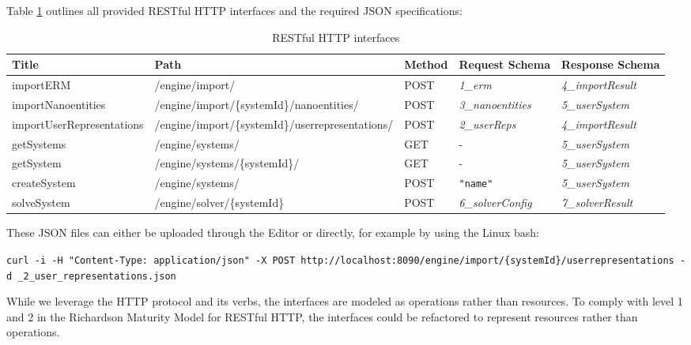 Table \ref{tab:restApis} outlines all provided RESTful HTTP interfaces and the required \gls{JSON} specifications:

\begin{table}[H]
	\centering
	\caption{RESTful HTTP interfaces}
	\label{tab:restApis}
	\begin{tabular}{|p{90pt}|p{140pt}|p{40pt}|p{80pt}|p{80pt}|}
		\hline	
		\textbf{Title} & \textbf{Path} & \textbf{Method} & \textbf{Request Schema} &\textbf{Response Schema} \\
		\hline
		importERM & /engine/import/ & POST & \textit{1\_erm} & \textit{4\_importResult} \\
		\hline
		importNanoentities & /engine/import/\{systemId\}/\newline nanoentities/ & POST & \textit{3\_nanoentities} & \textit{5\_userSystem} \\
		\hline 
		importUser\newline Representations & /engine/import/\{systemId\}/\newline userrepresentations/ & POST &  \textit{2\_userReps} &  \textit{4\_importResult} \\
		\hline 
		getSystems & /engine/systems/ & GET & - &  \textit{5\_userSystem} \\
		\hline 
		getSystem & /engine/systems/\{systemId\}/ & GET & - & \textit{5\_userSystem} \\
		\hline 
		createSystem & /engine/systems/ & POST & \texttt{"name"} &  \textit{5\_userSystem} \\
		\hline
		solveSystem & /engine/solver/\{systemId\} & POST & \textit{6\_solverConfig} & \textit{7\_solverResult} \\
		\hline
	\end{tabular}
\end{table}

These JSON files can either be uploaded through the Editor or directly, for example by using the Linux bash:

\texttt{curl -i -H "Content-Type: application/json" -X POST \newline http://localhost:8090/engine/import/\{systemId\}/userrepresentations -d \@booking\_2\_user\_representations.json}

While we leverage the HTTP protocol and its verbs, the interfaces are modeled as operations rather than resources. To comply with level 1 and 2 in the Richardson Maturity Model\cite{fowler2010richardson} for RESTful HTTP, the interfaces could be refactored to represent resources rather than operations. 

